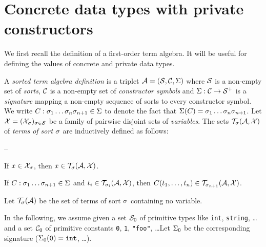 
\section{Concrete data types with private constructors}
\label{sec-pdt}


We first recall the definition of a first-order term algebra. It will
be useful for defining the values of concrete and private data types.

\begin{dfn}
A {\em sorted term algebra definition} is a triplet $\cA=(\cS,\cC,\S)$
where $\cS$ is a non-empty set of {\em sorts}, $\cC$ is a non-empty
set of {\em constructor symbols} and $\S:\cC\a\cS^+$ is a {\em
signature} mapping a non-empty sequence of sorts to every constructor
symbol. We write $C:\s_1 \ldots\s_n\s_{n+1}\in\S$ to denote the fact
that $\S(C)=\s_1 \ldots\s_n\s_{n+1}$. Let $\cX=(\cX_\s)_{\s\in\cS}$ be
a family of pairwise disjoint sets of {\em variables}. The sets
$\cT_\s(\cA,\cX)$ of {\em terms of sort $\s$} are inductively defined
as follows:

\begin{lst}{--}
\item If $x\in\cX_\s$, then $x\in\cT_\s(\cA,\cX)$.
\item If $C:\s_1\ldots\s_{n+1}\in\S$ and
$t_i\in\cT_{\s_i}(\cA,\cX)$, then
${C(t_1,\ldots,t_n)}\in\cT_{\s_{n+1}}(\cA,\cX)$.
\end{lst}

\noindent
Let $\cT_\s(\cA)$ be the set of terms of sort $\s$ containing no
variable.%
\end{dfn}

In the following, we assume given a set $\cS_0$ of primitive types
like {\tt int}, {\tt string}, \ldots and a set $\cC_0$ of primitive
constants {\tt 0}, {\tt 1}, {\tt "foo"}, \ldots  Let $\S_0$ be the
corresponding signature ($\S_0({\tt 0})={\tt int}$, \ldots).


